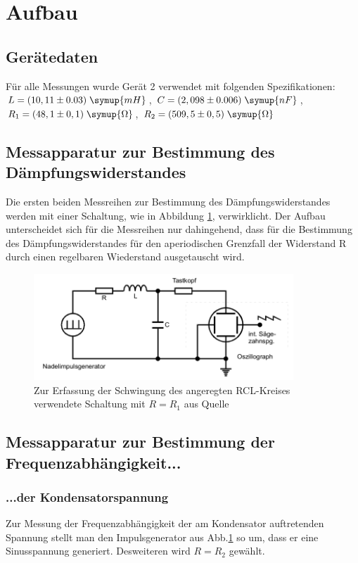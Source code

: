 \section{Aufbau}
\label{sec:aufbau}
\subsection{Gerätedaten}
Für alle Messungen wurde Gerät 2 verwendet mit folgenden Spezifikationen:\\
$L= (10,11\pm 0.03)\;\symup{mH}$, $C=(2,098 \pm 0.006)\;\symup{nF}$,
$R_1 =(48,1 \pm 0,1)\; \symup{\Omega}$, $R_2=(509,5 \pm 0,5)\;\symup{\Omega}$

\subsection{Messapparatur zur Bestimmung des Dämpfungswiderstandes}
\label{ssec:a12}
Die ersten beiden Messreihen zur Bestimmung des Dämpfungswiderstandes
werden mit einer Schaltung, wie in Abbildung \ref{fig:5a}, verwirklicht.
Der Aufbau unterscheidet sich für die Messreihen nur dahingehend, dass
für die Bestimmung des Dämpfungswiderstandes für den aperiodischen Grenzfall
der Widerstand R durch einen regelbaren Wiederstand ausgetauscht wird.
\begin{figure}
  \centering
  \includegraphics[height= 4cm]{./logos/Amplitude_Schaltung.PNG}
  \caption{Zur Erfassung der Schwingung des angeregten RCL-Kreises verwendete
  Schaltung mit $R = R_1$ aus Quelle \cite{sample}}
  \label{fig:5a}
\end{figure}
\FloatBarrier
\subsection{Messapparatur zur Bestimmung der Frequenzabhängigkeit...}
\subsubsection{...der Kondensatorspannung}
Zur Messung der Frequenzabhängigkeit der am Kondensator auftretenden Spannung
stellt man den Impulsgenerator aus Abb.\ref{fig:5a} so um, dass er eine
Sinusspannung generiert. Desweiteren wird $R=R_2$ gewählt.
